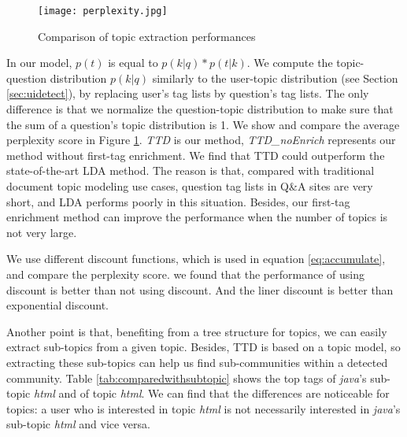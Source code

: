 \begin{figure}[htp]
\centering
\texttt{[image: perplexity.jpg]}  %
\caption{Comparison of topic extraction performances}
\label{fig:tagperplexity} 
\end{figure}

In our model, $p(t)$ is equal to $p(k|q)*p(t|k)$. We compute the topic-question distribution $p(k|q)$ similarly to the user-topic distribution (see Section \ref{sec:uidetect}), by replacing user's tag lists by question's tag lists. The only difference is that we normalize the question-topic distribution to make sure that the sum of a question's topic distribution is 1. We show and compare the average perplexity score in Figure \ref{fig:tagperplexity}. \textit{TTD} is our method, \textit{TTD\_noEnrich} represents our method without first-tag enrichment. We find that TTD could outperform the state-of-the-art LDA method. The reason is that, compared with traditional document topic modeling use cases, question tag lists in Q\&A sites are very short, and LDA performs poorly in this situation. Besides, our first-tag enrichment method can improve the performance when the number of topics is not very large. 

We use different discount functions, which is used in equation \ref{eq:accumulate}, and compare the perplexity score. we found that the performance of using discount is better than not using discount. And the liner discount is better than exponential discount. 

Another point is that, benefiting from a tree structure for topics, we can easily extract sub-topics from a given topic. Besides, TTD is based on a topic model, so extracting these sub-topics can help us find sub-communities within a detected community. Table \ref{tab:comparedwithsubtopic} shows the top tags of \textit{java}'s sub-topic \textit{html} and of topic \textit{html}. We can find that the differences are noticeable for topics: a user who is interested in topic \textit{html} is not necessarily interested in \textit{java}'s sub-topic \textit{html} and vice versa. 

